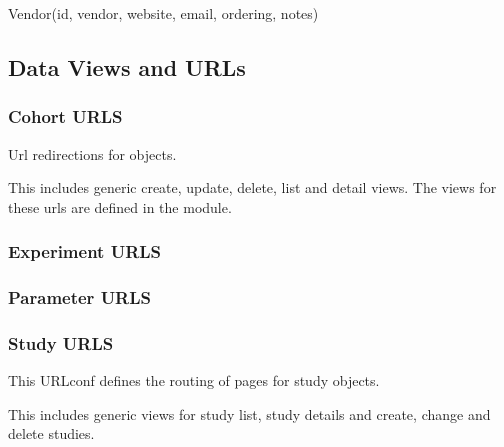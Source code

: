 \documentclass[letterpaper,10pt,english]{sphinxmanual}
\begin{document}

\begin{fulllineitems}
\label{data:mousedb.data.models.Vendor}
Vendor(id, vendor, website, email, ordering, notes)

\end{fulllineitems}



\subsection{Data Views and URLs}
\label{data:data-views-and-urls}\label{data:module-mousedb.data.urls}

\subsubsection{Cohort URLS}
\label{data:cohort-urls}\label{data:module-mousedb.data.urls.cohort}
Url redirections for {\hyperref[data:mousedb.data.models.Cohort]{}} objects.

This includes generic create, update, delete, list and detail views.
The views for these urls are defined in the \code{} module.


\subsubsection{Experiment URLS}
\label{data:module-mousedb.data.urls.experiment}\label{data:experiment-urls}

\subsubsection{Parameter URLS}
\label{data:parameter-urls}\label{data:module-mousedb.data.urls.parameter}

\subsubsection{Study URLS}
\label{data:study-urls}\label{data:module-mousedb.data.urls.study}
This URLconf defines the routing of pages for study objects.

This includes generic views for study list, study details and create, change and delete studies.
\end{document}
